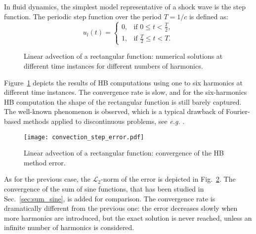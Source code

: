
In fluid dynamics, the simplest model 
representative of a shock wave
is the step function.
The periodic step function over the period $T=1/c$ is defined as:
\begin{equation}
    u_l(t) = 
    \begin{cases}
        0, & \text{if } 0 \leq t < \frac{T}{2}, \\
        1, & \text{if } \frac{T}{2} \leq t < T.
    \end{cases}
    \label{eq:inject_step}
\end{equation}

\begin{figure}[htp]
  \centering
  \caption{Linear advection of a rectangular function: 
  numerical solutions at different time instances for different numbers of harmonics.}

  \label{fig:inj_step_results}
\end{figure}

Figure~\ref{fig:inj_step_results} depicts the results of HB computations
using one to six harmonics at different time instances. The convergence rate 
is slow, and for the six-harmonics HB computation the
shape of the rectangular function is still barely captured. 
The well-known \citet{Gibbs1899}
phenomenon is observed, which is a typical drawback 
of Fourier-based methods applied to discontinuous problems, 
see \emph{e.g.} \citet{Canuto2006}.

\begin{figure}[htp]
  \centering
  \texttt{[image: convection\_step\_error.pdf]}
  \caption{Linear advection of a rectangular function: convergence of the HB method error.}
  \label{fig:conv_step}
\end{figure}
As for the previous case, the $\mathcal{L}_2$-norm 
of the error is depicted in Fig.~\ref{fig:conv_step}. 
The convergence of the sum of sine functions, that has been studied in Sec.~\ref{sec:sum_sine},
is added for comparison.
The convergence rate is dramatically different from the previous one: 
the error decreases slowly when more harmonics are introduced, 
but the exact solution is never reached, 
unless an infinite number of harmonics is considered.

